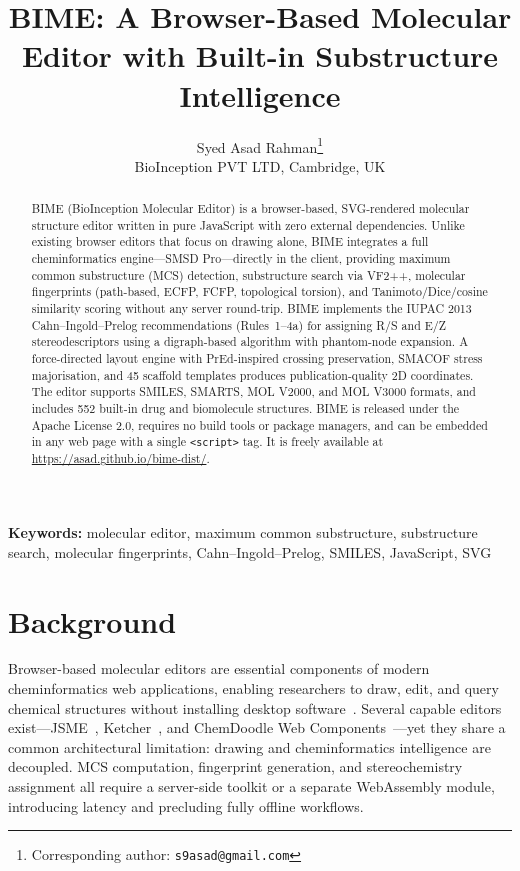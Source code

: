 \documentclass[twocolumn]{article}
\title{BIME: A Browser-Based Molecular Editor with Built-in Substructure Intelligence}
\author{
  Syed Asad Rahman\thanks{Corresponding author: \texttt{s9asad@gmail.com}} \\
  BioInception PVT LTD, Cambridge, UK
}
\date{}
\begin{document}
\maketitle

\begin{abstract}
BIME (BioInception Molecular Editor) is a browser-based, SVG-rendered
molecular structure editor written in pure JavaScript with zero external
dependencies.  Unlike existing browser editors that focus on drawing
alone, BIME integrates a full cheminformatics engine---SMSD
Pro---directly in the client, providing maximum common substructure
(MCS) detection, substructure search via VF2++, molecular fingerprints
(path-based, ECFP, FCFP, topological torsion), and Tanimoto/Dice/cosine
similarity scoring without any server round-trip.  BIME implements the
IUPAC 2013 Cahn--Ingold--Prelog recommendations (Rules~1--4a) for
assigning R/S and E/Z stereodescriptors using a digraph-based algorithm
with phantom-node expansion.  A force-directed layout engine with
PrEd-inspired crossing preservation, SMACOF stress majorisation, and 45
scaffold templates produces publication-quality 2D coordinates.  The
editor supports SMILES, SMARTS, MOL V2000, and MOL V3000 formats, and
includes 552 built-in drug and biomolecule structures.  BIME is released
under the Apache License 2.0, requires no build tools or package
managers, and can be embedded in any web page with a single
\texttt{<script>} tag.  It is freely available at
\url{https://asad.github.io/bime-dist/}.
\end{abstract}

\noindent\textbf{Keywords:} molecular editor, maximum common
substructure, substructure search, molecular fingerprints,
Cahn--Ingold--Prelog, SMILES, JavaScript, SVG

\section{Background}

Browser-based molecular editors are essential components of modern
cheminformatics web applications, enabling researchers to draw, edit,
and query chemical structures without installing desktop
software~\citep{Bienfait2013,Ertl2010}.  Several capable editors
exist---JSME~\citep{Bienfait2013}, Ketcher~\citep{Ketcher2024}, and
ChemDoodle Web Components~\citep{Burger2015}---yet they share a common
architectural limitation: drawing and cheminformatics intelligence are
decoupled.  MCS computation, fingerprint generation, and stereochemistry
assignment all require a server-side toolkit or a separate WebAssembly
module, introducing latency and precluding fully offline workflows.
\end{document}
